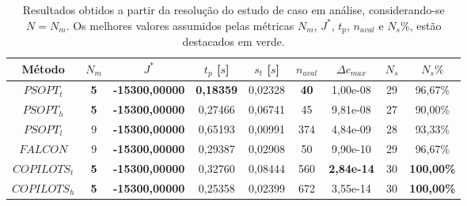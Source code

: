 \begin{table}
	\centering
	\caption{Resultados obtidos a partir da resolução do estudo de caso em análise, considerando-se $ N = N_m $. Os melhores valores assumidos pelas métricas $ N_m $, $ J^* $, $ t_p $, $ n_{aval} $ e $ N_s\% $, estão destacados em verde.}
	\label{tab:fermentacao:raw}
	\begin{tabular}{@{}ccccccccc@{}}
		\toprule
		Método       & $N_m$                             & $J^*$                                        & $t_p$ {[}$s${]}                         & $s_t$ {[}$s${]} & $n_{aval}$                         & $\Delta c_{max}$                         & $N_s$ & $N_s\%$                                  \\ \midrule
		$PSOPT_t$    & {\color[HTML]{009901} \textbf{5}} & {\color[HTML]{009901} \textbf{-15300,00000}} & {\color[HTML]{009901} \textbf{0,18359}} & 0,02328         & {\color[HTML]{009901} \textbf{40}} & 1,00e-08                                 & 29    & 96,67\%                                  \\
		$PSOPT_h$    & {\color[HTML]{009901} \textbf{5}} & {\color[HTML]{009901} \textbf{-15300,00000}} & 0,27466                                 & 0,06741         & 45                                 & 9,81e-08                                 & 27    & 90,00\%                                  \\
		$PSOPT_l$    & 9                                 & {\color[HTML]{009901} \textbf{-15300,00000}} & 0,65193                                 & 0,00991         & 374                                & 4,84e-09                                 & 28    & 93,33\%                                  \\
		$FALCON$     & 9                                 & {\color[HTML]{009901} \textbf{-15300,00000}} & 0,29387                                 & 0,02908         & 50                                 & 9,90e-10                                 & 29    & 96,67\%                                  \\
		$COPILOTS_t$ & {\color[HTML]{009901} \textbf{5}} & {\color[HTML]{009901} \textbf{-15300,00000}} & 0,32760                                 & 0,08444         & 560                                & {\color[HTML]{009901} \textbf{2,84e-14}} & 30    & {\color[HTML]{009901} \textbf{100,00\%}} \\
		$COPILOTS_h$ & {\color[HTML]{009901} \textbf{5}} & {\color[HTML]{009901} \textbf{-15300,00000}} & 0,25358                                 & 0,02399         & 672                                & 3,55e-14                                 & 30    & {\color[HTML]{009901} \textbf{100,00\%}} \\ \bottomrule
	\end{tabular}
\end{table}